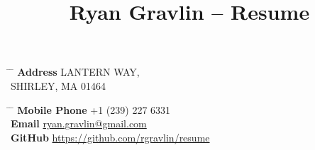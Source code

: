 \documentclass[10pt]{article} %
\begin{document}
\title{Ryan Gravlin -- Resume} %
\parbox{0.5\textwidth}{ %
\begin{tabbing} %
\hspace{3cm} \= \hspace{4cm} \= \kill %
{\bf Address}  LANTERN WAY,\\ %
\> SHIRLEY, MA 01464 \\ %
\end{tabbing}}
\hfill %
\parbox{0.5\textwidth}{ %
\begin{tabbing} %
\hspace{3cm} \= \hspace{4cm} \= \kill %
{\bf Mobile Phone} \> +1 (239) 227 6331 \\ %
{\bf Email} \> \href{mailto:ryan.gravlin@gmail.com}{ryan.gravlin@gmail.com} \\ %
{\bf GitHub} \> \href{https://github.com/rgravlin/resume}{https://github.com/rgravlin/resume} \\ %
\end{tabbing}}
\end{document}
